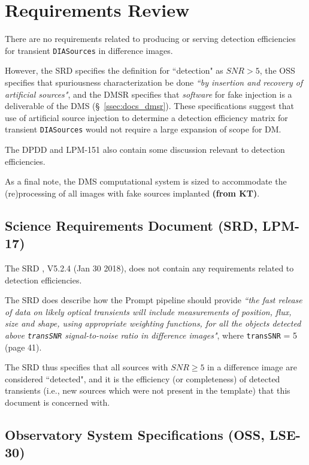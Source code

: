 \section{Requirements Review}\label{sec:docs}

There are no requirements related to producing or serving detection efficiencies for transient {\tt DIASources} in difference images.

However, the SRD specifies the definition for ``detection" as $SNR>5$, the OSS specifies that spuriousness characterization be done {\it ``by insertion and recovery of artificial sources"}, and the DMSR specifies that {\it software} for fake injection is a deliverable of the DMS (\S~\ref{ssec:docs_dmsr}).
These specifications suggest that use of artificial source injection to determine a detection efficiency matrix for transient {\tt DIASources} would not require a large expansion of scope for DM.

The DPDD and LPM-151 also contain some discussion relevant to detection efficiencies.

As a final note, the DMS computational system is sized to accommodate the (re)processing of all images with fake sources implanted {\bf (from KT)}.


\subsection{Science Requirements Document (SRD, LPM-17)}

The SRD , V5.2.4 (Jan 30 2018), does not contain any requirements related to detection efficiencies.

The SRD does describe how the Prompt pipeline should provide {\it ``the fast release of data on likely optical transients will include measurements of position, flux, size and shape, using appropriate weighting functions, for all the objects detected above {\tt transSNR} signal-to-noise ratio in difference images"}, where {\tt transSNR} = 5 (page 41).

The SRD thus specifies that all sources with $SNR \geq 5$ in a difference image are considered ``detected", and it is the efficiency (or completeness) of detected transients (i.e., new sources which were not present in the template) that this document is concerned with.


\subsection{Observatory System Specifications (OSS, LSE-30)}\label{ssec:docs_oss}

